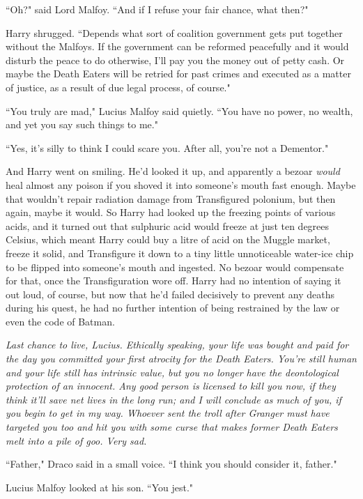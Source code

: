 ``Oh?" said Lord Malfoy. ``And if I refuse your fair chance, what then?"

Harry shrugged. ``Depends what sort of coalition government gets put together without the Malfoys. If the government can be reformed peacefully and it would disturb the peace to do otherwise, I'll pay you the money out of petty cash. Or maybe the Death Eaters will be retried for past crimes and executed as a matter of justice, as a result of due legal process, of course."

``You truly are mad," Lucius Malfoy said quietly. ``You have no power, no wealth, and yet you say such things to me."

``Yes, it's silly to think I could scare you. After all, you're not a Dementor."

And Harry went on smiling. He'd looked it up, and apparently a bezoar \emph{would} heal almost any poison if you shoved it into someone's mouth fast enough. Maybe that wouldn't repair radiation damage from Transfigured polonium, but then again, maybe it would. So Harry had looked up the freezing points of various acids, and it turned out that sulphuric acid would freeze at just ten degrees Celsius, which meant Harry could buy a litre of acid on the Muggle market, freeze it solid, and Transfigure it down to a tiny little unnoticeable water-ice chip to be flipped into someone's mouth and ingested. No bezoar would compensate for that, once the Transfiguration wore off. Harry had no intention of saying it out loud, of course, but now that he'd failed decisively to prevent any deaths during his quest, he had no further intention of being restrained by the law or even the code of Batman.

\emph{Last chance to live, Lucius. Ethically speaking, your life was bought and paid for the day you committed your first atrocity for the Death Eaters. You're still human and your life still has intrinsic value, but you no longer have the deontological protection of an innocent. Any good person is licensed to kill you now, if they think it'll save net lives in the long run; and I will conclude as much of you, if you begin to get in my way. Whoever sent the troll after Granger must have targeted you too and hit you with some curse that makes former Death Eaters melt into a pile of goo. Very sad.}

``Father," Draco said in a small voice. ``I think you should consider it, father."

Lucius Malfoy looked at his son. ``You jest."

